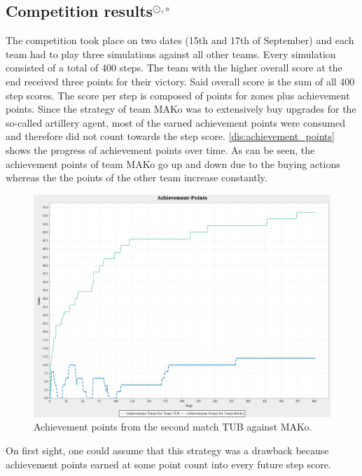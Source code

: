 \subsection{Competition results$^{\odot,\circ}$} %
The competition took place on two dates (15th and 17th of September) and each team had to play three simulations against all other teams.
Every simulation consisted of a total of 400 steps.
The team with the higher overall score at the end received three points for their victory.
Said overall score is the sum of all 400 step scores.
The score per step is composed of points for zones plus achievement points.
Since the strategy of team MAKo was to extensively buy upgrades for the so-called artillery agent, most of the earned achievement points were consumed and therefore did not count towards the step score.
\autoref{dis:achievement_points} shows the progress of achievement points over time.
As can be seen, the achievement points of team MAKo go up and down due to the buying actions whereas the the points of the other team increase constantly.
\begin{figure}[ht]
	\centering
	\includegraphics[width=\textwidth]{images/AchievementPoints.png}
	\caption{Achievement points from the second match TUB against MAKo.} %
	\label{dis:achievement_points}
\end{figure}
On first sight, one could assume that this strategy was a drawback because achievement points earned at some point count into every future step score.
